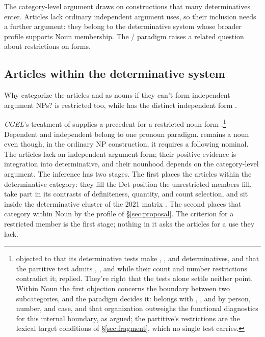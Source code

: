 \documentclass[12pt]{article}
\begin{document}
The category-level argument draws on constructions that many determinatives enter. Articles lack ordinary independent argument uses, so their inclusion needs a further argument: they belong to the determinative system whose broader profile supports Noun membership. The / paradigm raises a related question about restrictions on forms.

\subsection{Articles within the determinative system}\label{sec:article-membership}

Why categorize the articles  and  as nouns if they can't form independent argument NPs?  is restricted too, while  has the distinct independent form  \citep[371--372, 379, 410--412]{huddleston2002}.

\textit{CGEL}'s treatment of  supplies a precedent for a restricted noun form \citep[470--471]{huddleston2002}.\footnote{\textcite{lenchukahmed2014determinatives} objected to \textcite{reynolds2013determiners} that its determinative tests make , , and  determinatives, and that the partitive test admits , , and  while their count and number restrictions contradict it; \textcite{reynolds2014determinatives} replied. They're right that the tests alone settle neither point. Within Noun the first objection concerns the boundary between two subcategories, and the paradigm decides it:  belongs with , , and  by person, number, and case, and that organization outweighs the functional diagnostics for this internal boundary, as \textcite[10]{reynolds2013determiners} argued; the partitive's restrictions are the lexical target conditions of §\ref{sec:fragment}, which no single test carries.} Dependent  and independent  belong to one pronoun paradigm.  remains a noun even though, in the ordinary NP construction, it requires a following nominal. The articles lack an independent argument form; their positive evidence is integration into determinative, and their nounhood depends on the category-level argument. The inference has two stages. The first places the articles within the determinative category: they fill the Det position the unrestricted members fill, take part in its contrasts of definiteness, quantity, and count selection, and sit inside the determinative cluster of the 2021 matrix \citep[9--10]{reynolds2021}. The second places that category within Noun by the profile of §\ref{sec:proposal}. The criterion for a restricted member is the first stage; nothing in it asks the articles for a use they lack.
\end{document}
